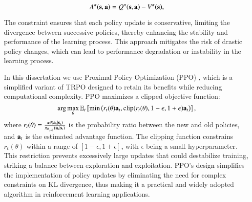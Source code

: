 \begin{equation}
A^\pi(\mathbf{s}, \mathbf{a}) = Q^\pi(\mathbf{s}, \mathbf{a}) - V^\pi(\mathbf{s}),
\end{equation}

The constraint ensures that each policy update is conservative, limiting the divergence between successive policies, thereby enhancing the stability and performance of the learning process. This approach mitigates the risk of drastic policy changes, which can lead to performance degradation or instability in the learning process.

In this dissertation we use Proximal Policy Optimization (PPO) \cite{schulman2017proximal}, which is a simplified variant of TRPO designed to retain its benefits while reducing computational complexity. PPO maximizes a clipped objective function:
\begin{equation}
\label{eq:ppo}
\arg\max_\theta \mathbb{E}_t \left[ \min \left( r_t(\theta) \mathbf{a}_t, \text{clip}(r_t(\theta), 1 - \epsilon, 1 + \epsilon) \mathbf{a}_t \right) \right],
\end{equation}
where $r_t(\theta) = \frac{\pi{\theta}(\mathbf{a}_t|\mathbf{s}_t)}{\pi_{\theta_{\text{old}}}(\mathbf{a}_t|\mathbf{s}_t)}$ is the probability ratio between the new and old policies, and $\mathbf{a}_t$ is the estimated advantage function. The clipping function constrains $r_t(\theta)$ within a range of $[1 - \epsilon, 1 + \epsilon]$, with $\epsilon$ being a small hyperparameter. This restriction prevents excessively large updates that could destabilize training, striking a balance between exploration and exploitation. PPO's design simplifies the implementation of policy updates by eliminating the need for complex constraints on KL divergence, thus making it a practical and widely adopted algorithm in reinforcement learning applications.

